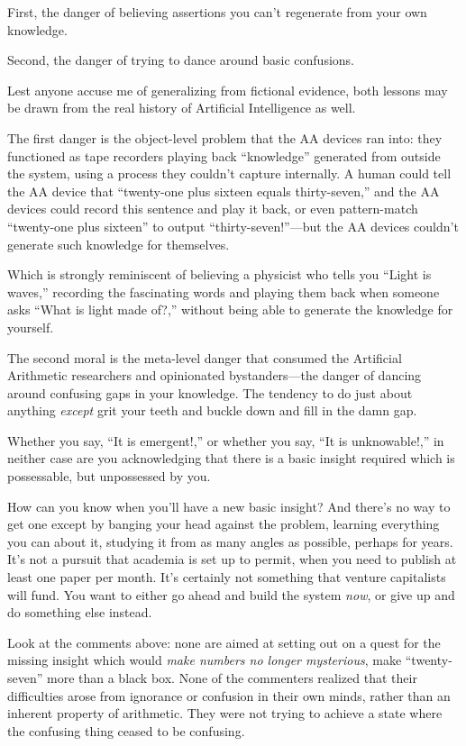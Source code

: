 {
 First, the danger of believing assertions you
can't regenerate from your own knowledge.}

{
 Second, the danger of trying to dance around basic confusions.}

{
 Lest anyone accuse me of generalizing from fictional evidence,
both lessons may be drawn from the real history of Artificial
Intelligence as well.}

{
 The first danger is the object-level problem that the AA devices
ran into: they functioned as tape recorders playing back
``knowledge'' generated from outside
the system, using a process they couldn't capture
internally. A human could tell the AA device that
``twenty-one plus sixteen equals
thirty-seven,'' and the AA devices could record this
sentence and play it back, or even pattern-match
``twenty-one plus sixteen'' to
output ``thirty-seven!''---but the
AA devices couldn't generate such knowledge for
themselves.}

{
 Which is strongly reminiscent of believing a physicist who tells
you ``Light is waves,'' recording
the fascinating words and playing them back when someone asks
``What is light made of?,'' without
being able to generate the knowledge for yourself.}

{
 The second moral is the meta-level danger that consumed the
Artificial Arithmetic researchers and opinionated bystanders---the
danger of dancing around confusing gaps in your knowledge. The tendency
to do just about anything \textit{except} grit your teeth and buckle
down and fill in the damn gap.}

{
 Whether you say, ``It is
emergent!,'' or whether you say,
``It is unknowable!,'' in neither
case are you acknowledging that there is a basic insight required which
is possessable, but unpossessed by you.}

{
 How can you know when you'll have a new basic
insight? And there's no way to get one except by
banging your head against the problem, learning everything you can
about it, studying it from as many angles as possible, perhaps for
years. It's not a pursuit that academia is set up to
permit, when you need to publish at least one paper per month.
It's certainly not something that venture capitalists
will fund. You want to either go ahead and build the system
\textit{now}, or give up and do something else instead.}

{
 Look at the comments above: none are aimed at setting out on a
quest for the missing insight which would \textit{make numbers no
longer mysterious}, make
``twenty-seven'' more than a black
box. None of the commenters realized that their difficulties arose from
ignorance or confusion in their own minds, rather than an inherent
property of arithmetic. They were not trying to achieve a state where
the confusing thing ceased to be confusing.}

